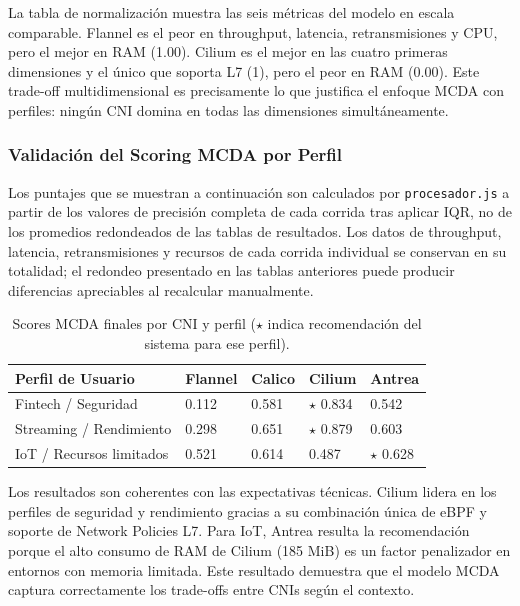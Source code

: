 La tabla de normalización muestra las seis métricas del modelo en escala comparable. Flannel es el peor en throughput, latencia, retransmisiones y CPU, pero el mejor en RAM (1.00). Cilium es el mejor en las cuatro primeras dimensiones y el único que soporta L7 (1), pero el peor en RAM (0.00). Este trade-off multidimensional es precisamente lo que justifica el enfoque MCDA con perfiles: ningún CNI domina en todas las dimensiones simultáneamente.

\subsubsection{Validación del Scoring MCDA por Perfil}

Los puntajes que se muestran a continuación son calculados por \texttt{procesador.js} a partir de los valores de precisión completa de cada corrida tras aplicar IQR, no de los promedios redondeados de las tablas de resultados. Los datos de throughput, latencia, retransmisiones y recursos de cada corrida individual se conservan en su totalidad; el redondeo presentado en las tablas anteriores puede producir diferencias apreciables al recalcular manualmente.

\begin{table}[htbp]
\centering
\scriptsize
\begin{tabularx}{\textwidth}{|Y|Y|Y|Y|Y|}
\hline
\textbf{Perfil de Usuario} & \textbf{Flannel} & \textbf{Calico} & \textbf{Cilium} & \textbf{Antrea} \\
\hline
Fintech / Seguridad & 0.112 & 0.581 & $\star$ 0.834 & 0.542 \\
Streaming / Rendimiento & 0.298 & 0.651 & $\star$ 0.879 & 0.603 \\
IoT / Recursos limitados & 0.521 & 0.614 & 0.487 & $\star$ 0.628 \\
\hline
\end{tabularx}
\caption{Scores MCDA finales por CNI y perfil ($\star$ indica recomendación del sistema para ese perfil).}
\end{table}

Los resultados son coherentes con las expectativas técnicas. Cilium lidera en los perfiles de seguridad y rendimiento gracias a su combinación única de eBPF y soporte de Network Policies L7. Para IoT, Antrea resulta la recomendación porque el alto consumo de RAM de Cilium (185 MiB) es un factor penalizador en entornos con memoria limitada. Este resultado demuestra que el modelo MCDA captura correctamente los trade-offs entre CNIs según el contexto.

